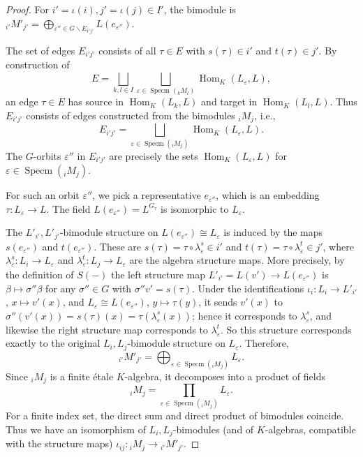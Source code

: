 \documentclass[a4paper,12pt,reqno]{amsart}
\DeclareMathOperator{\Specm}{\mathrm{Specm}}
\DeclareMathOperator{\Hom}{\mathrm{Hom}}
\theoremstyle{plain}
\theoremstyle{remark}
\begin{document}
\begin{proof}
    \smallskip
     For $i'=\iota(i), j'=\iota(j) \in I'$, the bimodule is ${}_{i'}M'_{j'} = \bigoplus_{\varepsilon'' \in G\backslash E_{i'j'}} L(e_{\varepsilon''})$.
    
    The set of edges $E_{i'j'}$ consists of all $\tau\in E$ with $s(\tau)\in i'$ and $t(\tau)\in j'$. By construction of
    \[
    E = \bigsqcup\limits_{k,l\in I}\bigsqcup\limits_{\varepsilon\in\Specm({}_kM_l)}\Hom_K(L_\varepsilon,L),
    \]
    an edge $\tau\in E$ has source in $\Hom_K(L_k,L)$ and target in $\Hom_K(L_l,L)$. Thus $E_{i'j'}$ consists of edges constructed from the bimodules ${}_iM_j$, i.e.,
    \[
    E_{i'j'} = \bigsqcup\limits_{\varepsilon\in\Specm({}_iM_j)}\Hom_K(L_\varepsilon,L).
    \]
    The $G$-orbits $\varepsilon''$ in $E_{i'j'}$ are precisely the sets $\Hom_K(L_\varepsilon,L)$ for $\varepsilon \in\Specm({}_iM_j)$.
    
    For such an orbit $\varepsilon''$, we pick a representative $e_{\varepsilon''}$, which is an embedding $\tau\colon L_\varepsilon \to L$. The field $L(e_{\varepsilon''}) = L^{G_{\tau}}$ is isomorphic to $L_\varepsilon$.
    
    The $L'_{i'},L'_{j'}$-bimodule structure on $L(e_{\varepsilon''}) \cong L_\varepsilon$ is induced by the maps $s(e_{\varepsilon''})$ and $t(e_{\varepsilon''})$. These are $s(\tau) = \tau\circ\lambda^s_\varepsilon \in i'$ and $t(\tau) = \tau\circ\lambda^t_\varepsilon \in j'$, where $\lambda^s_\varepsilon\colon L_i\to L_\varepsilon$ and $\lambda^t_\varepsilon\colon L_j\to L_\varepsilon$ are the algebra structure maps. More precisely, by the definition of $S(-)$ the left structure map $L'_{i'}=L(v')\to L(e_{\varepsilon''})$ is $\beta\mapsto\sigma''\beta$ for any $\sigma''\in G$ with $\sigma''v'=s(\tau)$. Under the identifications $\iota_i\colon L_i\to L'_{i'}$, $x\mapsto v'(x)$, and $L_\varepsilon\cong L(e_{\varepsilon''})$, $y\mapsto\tau(y)$, it sends $v'(x)$ to $\sigma''(v'(x))=s(\tau)(x)=\tau(\lambda^s_\varepsilon(x))$; hence it corresponds to $\lambda^s_\varepsilon$, and likewise the right structure map corresponds to $\lambda^t_\varepsilon$. So this structure corresponds exactly to the original $L_i,L_j$-bimodule structure on $L_\varepsilon$. Therefore,
    \[
      {}_{i'}M'_{j'} = \bigoplus_{\varepsilon \in \Specm({}_iM_j)} L_\varepsilon.
    \]
    Since ${}_iM_j$ is a finite \'etale $K$-algebra, it decomposes into a product of fields
    \[
      {}_iM_j = \prod\limits_{\varepsilon \in \Specm({}_iM_j)} L_\varepsilon.
    \]
    For a finite index set, the direct sum and direct product of bimodules coincide. Thus we have an isomorphism of $L_i,L_j$-bimodules (and of $K$-algebras, compatible with the structure maps) $\iota_{ij}\colon {}_iM_j \to {}_{i'}M'_{j'}$.
    

\end{proof}
\end{document}
